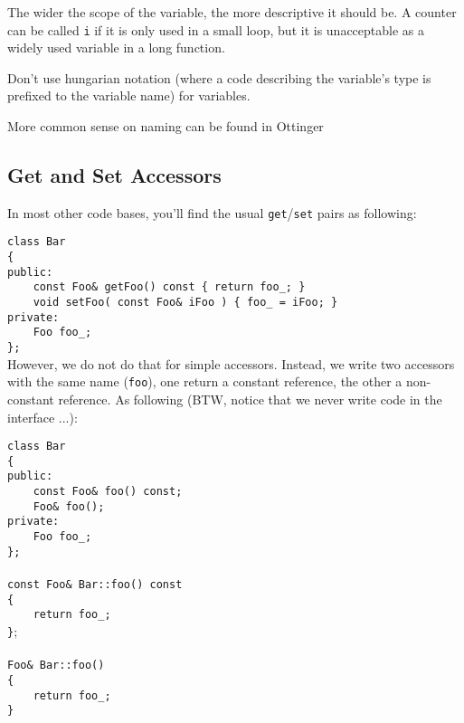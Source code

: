 \documentclass[10pt,a4paper,titlepage,dutch]{report}
\begin{document}
The wider the scope of the variable, the more descriptive it
should be. A counter can be called \verb|i| if it is only used in
a small loop, but it is unacceptable as a widely used variable in
a long function.

Don't use hungarian notation (where a code describing the
variable's type is prefixed to the variable name) for variables.

More common sense on naming can be found in Ottinger
\cite{Ottinger}

\subsection{Get and Set Accessors}

In most other code bases, you'll find the usual
\verb|get|/\verb|set| pairs as following:

\verb|class Bar|\\
\verb|{|\\
\verb|public:|\\
\verb|    const Foo& getFoo() const { return foo_; }|\\
\verb|    void setFoo( const Foo& iFoo ) { foo_ = iFoo; }|\\
\verb|private:|\\
\verb|    Foo foo_;|\\
\verb|};|\\

However, we do not do that for simple accessors.  Instead, we
write two accessors with the same name (\verb|foo|), one return a
constant reference, the other a non-constant reference.  As
following (BTW, notice that we never write code in the interface
...):

\verb|class Bar|\\
\verb|{|\\
\verb|public:|\\
\verb|    const Foo& foo() const;|\\
\verb|    Foo& foo();|\\
\verb|private:|\\
\verb|    Foo foo_;|\\
\verb|};|\\
\verb||\\
\verb|const Foo& Bar::foo() const|\\
\verb|{|\\
\verb|    return foo_;|\\
\verb|}|;\\
\verb||\\
\verb|Foo& Bar::foo()|\\
\verb|{|\\
\verb|    return foo_;|\\
\verb|}|\\
\end{document}
